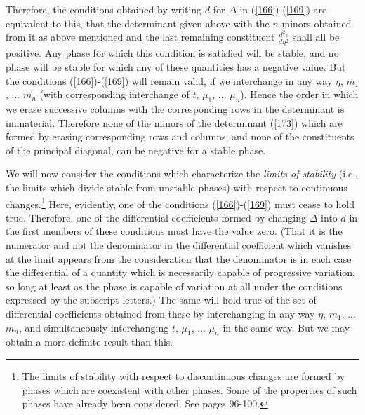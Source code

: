 \documentclass[12pt]{article}
\begin{document}
Therefore, the conditions obtained by writing $d$ for $\Delta$ in (\ref{166})-(\ref{169}) are equivalent to this, that the determinant given above with the $n$ minors obtained from it as above mentioned and the last remaining constituent $\frac{d^2\epsilon}{d \eta^2}$ shall all be positive.  Any phase for which this condition is satisfied will be stable, and no phase will be stable for which any of these quantities has a negative value. But the conditions (\ref{166})-(\ref{169}) will remain valid, if we interchange in any way $\eta$, $m_1$, ... $m_n$ (with corresponding interchange of $t$, $\mu_1$, ... $\mu_n$).  Hence the order in which we erase successive columns with the corresponding rows in the determinant is immaterial. Therefore none of the minors of the determinant (\ref{173}) which are formed by erasing corresponding rows and columns, and none of the constituents of the principal diagonal, can be negative for a stable phase.


We will now consider the conditions which characterize the \textit{limits of stability} (i.e., the limits which divide stable from unstable phases) with respect to continuous changes.\footnote{The limits of stability with respect to discontinuous changes are formed by phases which are coexistent with other phases. Some of the properties of such phases have already been considered. See pages 96-100.} Here, evidently, one of the conditions (\ref{166})-(\ref{169}) must cease to hold true. Therefore, one of the differential coefficients formed by changing $\Delta$ into $d$ in the first members of these conditions must have the value zero. (That it is the numerator and not the denominator in the differential coefficient which vanishes at the limit appears from the consideration that the denominator is in each case the differential of a quantity which is necessarily capable of progressive variation, so long at least as the phase is capable of variation at all under the conditions expressed by the subscript letters.) The same will hold true of the set of differential coefficients obtained from these by interchanging in any way $\eta$, $m_1$, ... $m_n$, and simultaneously interchanging $t$, $\mu_1$, ... $\mu_n$ in the same way. But we may obtain a more definite result than this.
\end{document}
